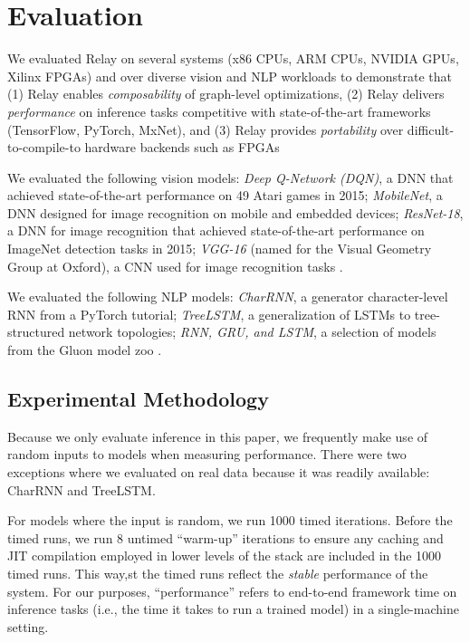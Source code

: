 \section{Evaluation}
\label{sec:eval}

We evaluated Relay on several systems (x86 CPUs, ARM CPUs, NVIDIA GPUs, Xilinx FPGAs) and over
  diverse vision and NLP workloads to demonstrate that (1) Relay enables \emph{composability} of
  graph-level optimizations, (2) Relay delivers \emph{performance} on inference tasks competitive
  with state-of-the-art frameworks (TensorFlow, PyTorch, MxNet), and (3) Relay provides
  \emph{portability} over difficult-to-compile-to hardware backends such as FPGAs

We evaluated the following vision models:
  \textit{Deep Q-Network (DQN)}, a DNN that achieved state-of-the-art performance
  on 49 Atari games in 2015;
  \textit{MobileNet}, a DNN designed for image recognition on mobile and
  embedded devices;
  \textit{ResNet-18}, a DNN for image recognition that achieved state-of-the-art
  performance on ImageNet detection tasks in 2015;
  \textit{VGG-16} (named for the Visual Geometry Group
  at Oxford), a CNN used for image recognition tasks
  \citep{dqn, mobilenet, resnet, vgg}.

We evaluated the following NLP models:
  \textit{CharRNN}, a generator character-level
  RNN from a PyTorch tutorial;
  \textit{TreeLSTM}, a generalization of LSTMs to
  tree-structured network topologies;
  \textit{RNN, GRU, and LSTM}, a selection of models from the Gluon
  model zoo
  \citep{pytorch_rnn_tut, tree_lstm, gluon_model_zoo}.

\subsection{Experimental Methodology}
  Because we only evaluate inference in this paper,
    we frequently make use of random inputs to models when measuring
    performance.
  There were two exceptions where we evaluated on real data because
    it was readily available: CharRNN and TreeLSTM.

  For models where the input is random,
    we run 1000 timed iterations.
  Before the timed runs,
    we run 8 untimed ``warm-up'' iterations to ensure any caching and JIT compilation
    employed in lower levels of the stack are included in the 1000 timed runs.
  This way,st
    the timed runs reflect the \textit{stable} performance of the system.
  For our purposes, ``performance'' refers to end-to-end framework time on
    inference tasks (i.e., the time it takes to run a trained model) in a
    single-machine setting.

